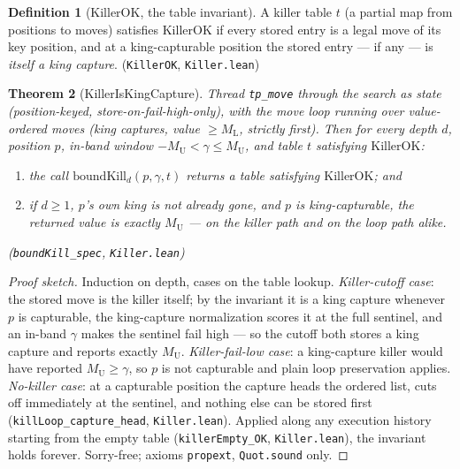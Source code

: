 \documentclass[11pt]{article}
\newcommand{\MU}{M_{\mathrm{U}}}    %
\newcommand{\ML}{M_{\mathrm{L}}}    %
\newcommand{\leanref}[2]{(\texttt{#1}, \texttt{#2})}%
\theoremstyle{plain}
\newtheorem{theorem}{Theorem}[section]
\theoremstyle{definition}
\newtheorem{definition}[theorem]{Definition}
\theoremstyle{remark}
\begin{document}
\begin{definition}[KillerOK, the table invariant]
A killer table $t$ (a partial map from positions to moves) satisfies
$\mathrm{KillerOK}$ if every stored entry is a legal move of its key
position, and at a king-capturable position the stored entry --- if any
--- is \emph{itself a king capture}.
\leanref{KillerOK}{Killer.lean}
\end{definition}

\begin{theorem}[KillerIsKingCapture]
\label{thm:killer}
Thread \texttt{tp\_move} through the search as state (position-keyed,
store-on-fail-high-only), with the move loop running over
value-ordered moves (king captures, value $\ge \ML$, strictly first).
Then for every depth $d$, position $p$, in-band window
$-\MU < \gamma \le \MU$, and table $t$ satisfying $\mathrm{KillerOK}$:
\begin{enumerate}
  \item the call $\mathrm{boundKill}_d(p, \gamma, t)$ returns a table
    satisfying $\mathrm{KillerOK}$; and
  \item if $d \ge 1$, $p$'s own king is not already gone, and $p$ is
    king-capturable, the returned value is \emph{exactly} $\MU$ --- on
    the killer path and on the loop path alike.
\end{enumerate}
\leanref{boundKill\_spec}{Killer.lean}
\end{theorem}

\begin{proof}[Proof sketch]
Induction on depth, cases on the table lookup.  \emph{Killer-cutoff
case}: the stored move is the killer itself; by the invariant it is a
king capture whenever $p$ is capturable, the king-capture normalization
scores it at the full sentinel, and an in-band $\gamma$ makes the
sentinel fail high --- so the cutoff both stores a king capture and
reports exactly $\MU$.  \emph{Killer-fail-low case}: a king-capture
killer would have reported $\MU \ge \gamma$, so $p$ is not capturable
and plain loop preservation applies.  \emph{No-killer case}: at a
capturable position the capture heads the ordered list, cuts off
immediately at the sentinel, and nothing else can be stored first
\leanref{killLoop\_capture\_head}{Killer.lean}.  Applied along any
execution history starting from the empty table
\leanref{killerEmpty\_OK}{Killer.lean}, the invariant holds forever.
Sorry-free; axioms \texttt{propext}, \texttt{Quot.sound} only.
\end{proof}
\end{document}
